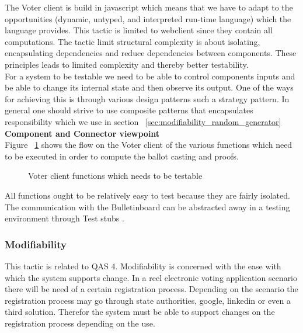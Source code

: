\noindent
The Voter client is build in javascript which means that we have to adapt to the opportunities (dynamic, untyped, and interpreted run-time language) which the language provides. This tactic is limited to webclient since they contain all computations. The tactic limit structural complexity is about isolating, encapsulating dependencies and reduce dependencies between components. These principles leads to limited complexity and thereby better testability.   \\

\noindent
 For a system to be testable we need to be able to control components inputs and be able to change its internal state and then observe its output. One of the ways for achieving this is through various design patterns such a strategy pattern. In general one should strive to use composite patterns that encapsulates responsibility which we use in  section ~\ref{sec:modifiability_random_generator}  \\


\noindent
\textbf{Component and Connector viewpoint}\\
Figure ~\ref{fig:voterclient_functions_which_needs_to_be_testable}  shows the flow on the Voter client of the various functions which need to be executed in order to compute the ballot casting and proofs.

\begin{figure}[H]
\centering
  \caption{Voter client functions which needs to be testable}  
   \label{fig:voterclient_functions_which_needs_to_be_testable}
\end{figure}


\noindent
All functions ought to be relatively easy to test because they are fairly isolated. The communication with the Bulletinboard can be abstracted away in a testing environment through Test stubs \cite{Baerbak10}. 




\subsubsection{Modifiability} \label{sec:modifiability_registations_process}
This tactic is related to QAS 4. Modifiability is concerned with the ease with which the system supports change. In a reel electronic voting application scenario there will be need of a certain registration process. Depending on the scenario the registration process may go through state authorities, google, linkedin or even a third solution. Therefor the system must be able to support changes on the registration process depending on the use.  \\


